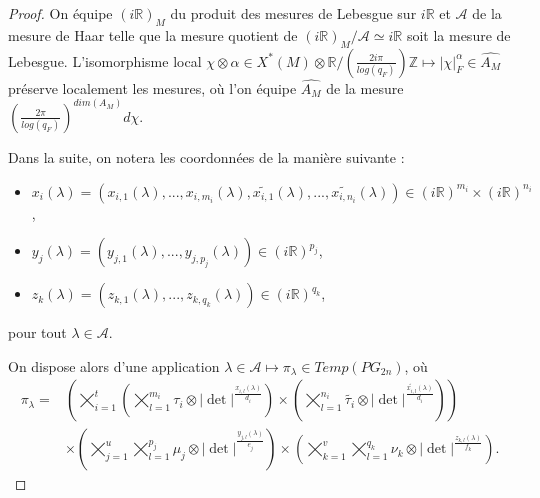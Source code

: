 \documentclass{amsart}
\begin{document}
\begin{proof}
On équipe $(i\mathbb{R})_M$ du produit des mesures de Lebesgue sur $i\mathbb{R}$ et $\mathcal{A}$ de la mesure de Haar telle que la mesure quotient de $(i\mathbb{R})_M/\mathcal{A} \simeq i\mathbb{R}$ soit la mesure de Lebesgue. L'isomorphisme local $\chi \otimes \alpha \in X^*(M) \otimes \mathbb{R}/(\frac{2i\pi}{log(q_F)})\mathbb{Z} \mapsto |\chi|^\alpha_F \in \widehat{A_M}$ préserve localement les mesures, où l'on équipe $\widehat{A_M}$ de la mesure $\left(\frac{2\pi}{log(q_F)}\right)^{dim(A_M)}d\chi$.

Dans la suite, on notera les coordonnées de la manière suivante :
\begin{itemize}
\item $x_i(\lambda) = (x_{i,1}(\lambda), ..., x_{i, m_i}(\lambda), \widetilde{x_{i, 1}}(\lambda), ..., \widetilde{x_{i,n_i}}(\lambda)) \in (i\mathbb{R})^{m_i} \times (i\mathbb{R})^{n_i}$,
\item $y_j(\lambda) = (y_{j,1}(\lambda), ..., y_{j, p_j}(\lambda)) \in (i\mathbb{R})^{p_j}$,
\item $z_k(\lambda) = (z_{k,1}(\lambda), ..., z_{k, q_k}(\lambda)) \in (i\mathbb{R})^{q_k}$,
\end{itemize}
pour tout $\lambda \in \mathcal{A}$.

On dispose alors d'une application $\lambda \in \mathcal{A} \mapsto \pi_\lambda \in Temp(PG_{2n})$, où
\begin{equation}
\begin{split}
\pi_{\lambda} = &\left( \bigtimes_{i=1}^t \left( \bigtimes_{l=1}^{m_i} \tau_i \otimes |\det|^{\frac{x_{i,l}(\lambda)}{d_i}} \right) \times \left( \bigtimes_{l=1}^{n_i} \widetilde{\tau_i} \otimes |\det|^{\frac{\widetilde{x_{i,l}}(\lambda)}{d_i}} \right) \right) \\
& \times \left( \bigtimes_{j=1}^u \bigtimes_{l=1}^{p_j} \mu_j\otimes |\det|^{\frac{y_{j,l}(\lambda)}{e_j}} \right) \times \left( \bigtimes_{k=1}^v \bigtimes_{l=1}^{q_k} \nu_k \otimes |\det|^{\frac{z_{k,l}(\lambda)}{f_k}} \right).
\end{split}
\end{equation}


\end{proof}
\end{document}
